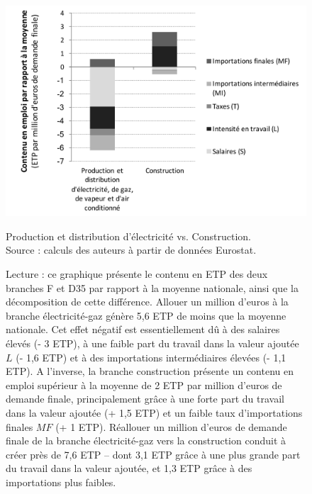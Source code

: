 \begin{figure}[!ht]
	\centering
	\includegraphics[width=12cm]{figures/comparaison1.pdf}
	\caption{Production et distribution d'électricité vs. Construction. \\ 
		Source : calculs des auteurs à partir de données Eurostat.}
	\label{fig:comparaison1}
	\captionsetup{justification=raggedright}
	\caption*{Lecture : ce graphique présente le contenu en ETP des deux branches F et D35 par rapport à la moyenne nationale, ainsi que la décomposition de cette différence. Allouer un million d'euros à la branche électricité-gaz génère 5,6 ETP de moins que la moyenne nationale. Cet effet négatif est essentiellement dû à des salaires élevés (- 3 ETP), à une faible part du travail dans la valeur ajoutée $L$ (- 1,6 ETP) et à des importations intermédiaires élevées (- 1,1 ETP). A l'inverse, la branche construction présente un contenu en emploi supérieur à la moyenne de 2 ETP par million d'euros de demande finale, principalement grâce à une forte part du travail dans la valeur ajoutée (+ 1,5 ETP) et un faible taux d'importations finales $MF$ (+ 1 ETP). 
	Réallouer un million d’euros de demande finale de la branche électricité-gaz vers la construction conduit à créer près de 7,6 ETP -- dont 3,1 ETP grâce à une plus grande part du travail dans la valeur ajoutée, et 1,3 ETP grâce à des importations plus faibles.}
\end{figure}

